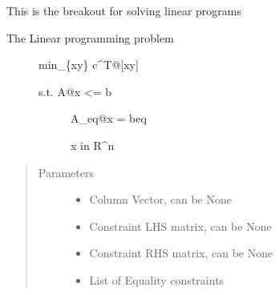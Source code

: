 \documentclass[letterpaper,10pt,english]{sphinxmanual}
\begin{document}
\begin{fulllineitems}
\begin{fulllineitems}
\label{\detokenize{ppopt:ppopt.solver.Solver.solve_lp}}
\sphinxAtStartPar
This is the breakout for solving linear programs
\begin{description}
\item[{The Linear programming problem}] \leavevmode
\sphinxAtStartPar
min\_\{xy\} c\textasciicircum{}T@{[}xy{]}
\begin{description}
\item[{s.t.   A@x \textless{}= b}] \leavevmode
\sphinxAtStartPar
A\_eq@x = beq

\sphinxAtStartPar
x in R\textasciicircum{}n

\end{description}

\end{description}
\begin{quote}\begin{description}
\item[{Parameters}] \leavevmode\begin{itemize}
\item {} 
\sphinxAtStartPar
{} \textendash{} Column Vector, can be None

\item {} 
\sphinxAtStartPar
{} \textendash{} Constraint LHS matrix, can be None

\item {} 
\sphinxAtStartPar
{} \textendash{} Constraint RHS matrix, can be None

\item {} 
\sphinxAtStartPar
{} \textendash{} List of Equality constraints


\end{itemize}
\end{description}
\end{quote}
\end{fulllineitems}
\end{fulllineitems}
\end{document}
